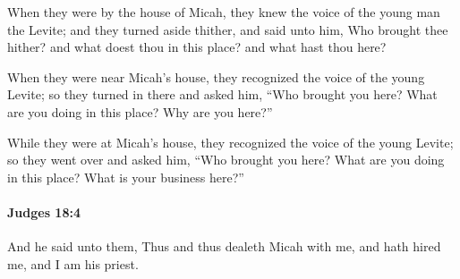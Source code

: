 			\begin{versebox}
					\item[BHS] 
					\item[ASV] When they were by the house of Micah, they knew the voice of the young man the Levite; and they turned aside thither, and said unto him, Who brought thee hither? and what doest thou in this place? and what hast thou here?
					\item[NIV] When they were near Micah’s house, they recognized the voice of the young Levite; so they turned in there and asked him, “Who brought you here? What are you doing in this place? Why are you here?”
					\item[NRSV] While they were at Micah’s house, they recognized the voice of the young Levite; so they went over and asked him, “Who brought you here? What are you doing in this place? What is your business here?”
			\end{versebox}

		\paragraph{Judges 18:4} %
			\label{JUDGES-18-4}

			And he said unto them, Thus and thus dealeth Micah with me, and hath hired me, and I am his priest.

